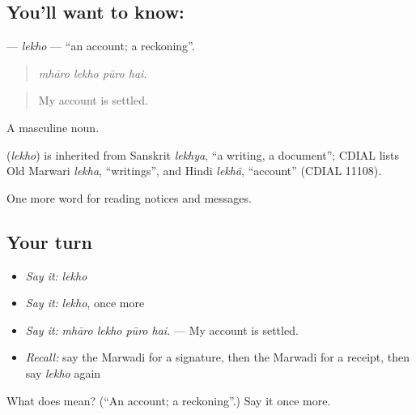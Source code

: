 \subsection*{You'll want to know: }
\textbf{} — \emph{lekho} — \textquotedblleft{}an account; a reckoning\textquotedblright{}.

\begin{quote}
   
\end{quote}

\begin{quote}
\emph{mhāro lekho pūro hai.}
\end{quote}

\begin{quote}
My account is settled.
\end{quote}

A masculine noun.

\begin{cousinweb}
\textbf{} (\emph{lekho}) is inherited from Sanskrit \emph{lekhya}, \textquotedblleft{}a writing, a document\textquotedblright{}; CDIAL lists Old Marwari \emph{lekha}, \textquotedblleft{}writings\textquotedblright{}, and Hindi \emph{lekhā}, \textquotedblleft{}account\textquotedblright{} (CDIAL 11108).
\end{cousinweb}

\begin{grammarlens}[title={What you've built}]
One more word for reading notices and messages.
\end{grammarlens}

\subsection*{Your turn}
\begin{itemize}
\raggedright
  \item \emph{Say it:} \emph{lekho}
  \item \emph{Say it:} \emph{lekho}, once more
  \item \emph{Say it:} \emph{mhāro lekho pūro hai.} — My account is settled.
  \item \emph{Recall:} say the Marwadi for a signature, then the Marwadi for a receipt, then say \emph{lekho} again
\end{itemize}

\begin{tcolorbox}[breakable,colback=teal!4,colframe=teal!35!black,title={Before you move on}]
What does  mean? (\textquotedblleft{}An account; a reckoning\textquotedblright{}.) Say it once more.
\end{tcolorbox}
